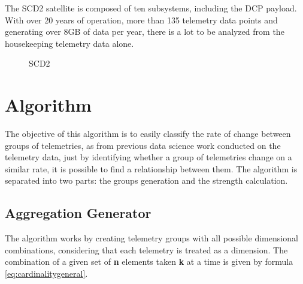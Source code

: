The SCD2 satellite is composed of ten subsystems, including the DCP payload.
With over 20 years of operation, more than 135 telemetry data points and generating over 8GB of data per year, there is a lot to be analyzed from the housekeeping telemetry data alone.

\begin{figure}[H]
  \caption{SCD2}\label{fig:scd2_mission}
  \vspace{6mm}
  \begin{center}
  \end{center}
  \vspace{2mm}
\end{figure}

\section{Algorithm}\label{ch:querypart:heur}

The objective of this algorithm is to easily classify the rate of change between groups of telemetries, as from previous data science work conducted on the telemetry data, just by identifying whether a group of telemetries change on a similar rate, it is possible to find a relationship between them.
The algorithm is separated into two parts: the groups generation and the strength calculation.

\hypertarget{aggregation-generator}{%
\subsection{Aggregation Generator}\label{ch:querypart:heur:agg}}

The algorithm works by creating telemetry groups with all possible dimensional combinations, considering that each telemetry is treated as a dimension.
The combination of a given set of \textbf{n} elements taken \textbf{k} at a time is given by formula \ref{eq:cardinalitygeneral}.

